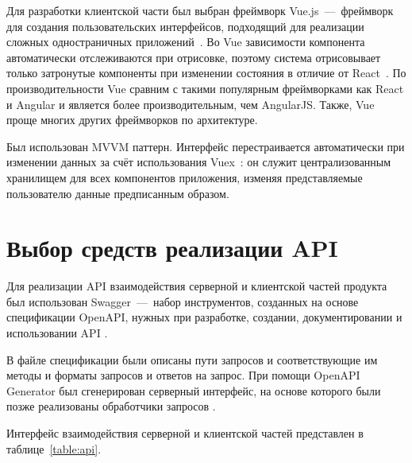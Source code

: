 Для разработки клиентской части был выбран фреймворк Vue.js~---~фреймворк для создания пользовательских интерфейсов, подходящий для реализации сложных одностраничных приложений~\cite{bib31}. Во Vue зависимости компонента автоматически отслеживаются при отрисовке, поэтому система отрисовывает только затронутые компоненты при изменении состояния в отличие от React~\cite{bib32}. По производительности Vue сравним с такими популярным фреймворками как React и Angular и является более производительным, чем AngularJS. Также, Vue проще многих других фреймворков по архитектуре. 

Был использован MVVM паттерн. Интерфейс перестраивается автоматически при изменении данных за счёт использования Vuex~\cite{bib36}: он служит централизованным хранилищем для всех компонентов приложения, изменяя представляемые пользователю данные предписанным образом.

\section{Выбор средств реализации API}
Для реализации API взаимодействия серверной и клиентской частей продукта был использован Swagger~---~набор инструментов, созданных на основе спецификации OpenAPI, нужных при разработке, создании, документировании и использовании API \cite{bib33}. 

В файле спецификации были описаны пути запросов и соответствующие им методы и форматы запросов и ответов на запрос. При помощи OpenAPI Generator был сгенерирован серверный интерфейс, на основе которого были позже реализованы обработчики запросов \cite{bib34}.

Интерфейс взаимодействия серверной и клиентской частей представлен в таблице~\ref{table:api}.

